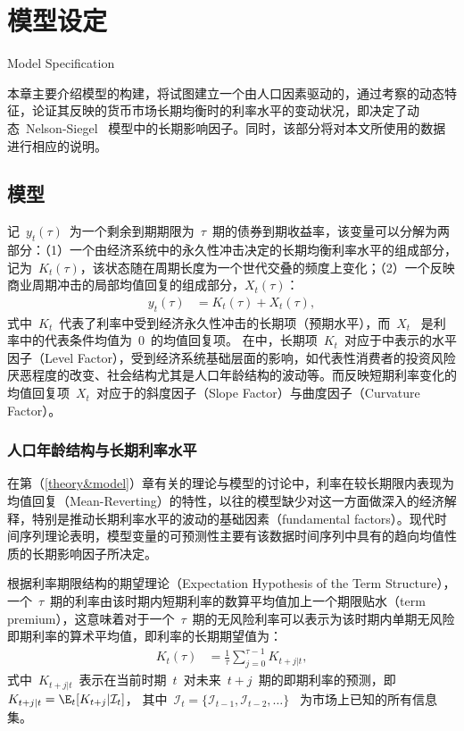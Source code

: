 
\chapter{模型设定}{Model Specification}
\label{chap03}

本章主要介绍模型的构建，将试图建立一个由人口因素驱动的\dns{}，通过考察\ds 的动态特征，论证其反映的货币市场长期均衡时的利率水平的变动状况，即\dsf 决定了动态~Nelson-Siegel~ 模型中的长期影响因子。同时，该部分将对本文所使用的数据进行相应的说明。

\section{模型}
记~$y_t(\tau)$~为一个剩余到期期限为~$\tau$~期的债券到期收益率，该变量可以分解为两部分：（1）一个由经济系统中的永久性冲击决定的长期均衡利率水平的组成部分，记为~$K_t(\tau)$，该状态随\dsf 在周期长度为一个世代交叠的频度上变化；（2）一个反映商业周期冲击的局部均值回复的组成部分，$X_t(\tau)$：
\begin{align}\label{chap03:yield}
   y_t(\tau) & = K_t(\tau) + X_t(\tau),
 \end{align}
式中~$K_t$~代表了利率中受到经济永久性冲击的长期项（预期水平），而~$X_t$~ 是利率中的代表条件均值为~0~的均值回复项。
在中，长期项~$K_t$~对应于中表示\dns 的水平因子（Level Factor），受到经济系统基础层面的影响，如代表性消费者的投资风险厌恶程度的改变、社会结构尤其是人口年龄结构的波动等。而反映短期利率变化的均值回复项~$X_t$~对应于\dns 的斜度因子（Slope Factor）与曲度因子（Curvature Factor）。

\subsection{人口年龄结构与长期利率水平}
在第（\ref{theory&model}）章有关\ts 的理论与模型的讨论中，利率在较长期限内表现为均值回复（Mean-Reverting）的特性，以往的模型缺少对这一方面做深入的经济解释，特别是推动长期利率水平的波动的基础因素（fundamental factors）。现代时间序列理论表明，模型变量的可预测性主要有该数据时间序列中具有的趋向均值性质的长期影响因子所决定。

根据利率期限结构的期望理论（Expectation Hypothesis of the Term Structure），一个~$\tau$~期的利率由该时期内短期利率的数算平均值加上一个期限贴水（term premium），这意味着对于一个~$\tau$~期的无风险利率可以表示为该时期内单期无风险即期利率的算术平均值，即利率的长期期望值为：
  \begin{align}\label{k}
   K_{t}(\tau) &=  \frac{1}{\tau}\sum_{j=0}^{\tau-1}K_{t+j|t},
 \end{align}
 式中~$K_{t+j|t}$~表示在当前时期~$t$~对未来~$t+j$~期的即期利率的预测，即~$K_{t+j|t}=\E_t[K_{t+j}|\mathcal{I}_t]$，
 其中~$\mathcal{I}_t=\{\mathcal{I}_{t-1},\mathcal{I}_{t-2},\ldots\}$~ 为市场上已知的所有信息集。

